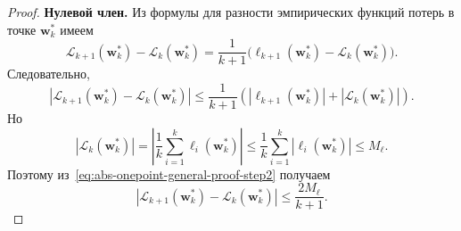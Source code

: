 \begin{proof}
    \textbf{Нулевой член.}
    Из формулы для разности эмпирических функций потерь в точке $\mathbf w_k^*$
    имеем
    \begin{equation}
        \label{eq:abs-onepoint-general-proof-step1}
        \mathcal L_{k+1}(\mathbf w_k^*)-\mathcal L_k(\mathbf w_k^*)
        =
        \frac{1}{k+1}
        \Big(
            \ell_{k+1}(\mathbf w_k^*)-\mathcal L_k(\mathbf w_k^*)
        \Big).
    \end{equation}
    Следовательно,
    \begin{equation}
        \label{eq:abs-onepoint-general-proof-step2}
        \left|
            \mathcal L_{k+1}(\mathbf w_k^*)-\mathcal L_k(\mathbf w_k^*)
        \right|
        \leqslant
        \frac{1}{k+1}
        \left(
            |\ell_{k+1}(\mathbf w_k^*)|
            +
            |\mathcal L_k(\mathbf w_k^*)|
        \right).
    \end{equation}
    Но
    \begin{equation}
        \label{eq:abs-onepoint-general-proof-step3}
        |\mathcal L_k(\mathbf w_k^*)|
        =
        \left|
            \frac{1}{k}\sum_{i=1}^k \ell_i(\mathbf w_k^*)
        \right|
        \leqslant
        \frac{1}{k}\sum_{i=1}^k |\ell_i(\mathbf w_k^*)|
        \leqslant
        M_\ell.
    \end{equation}
    Поэтому из~\eqref{eq:abs-onepoint-general-proof-step2} получаем
    \begin{equation}
        \label{eq:abs-onepoint-general-proof-step4}
        \left|
            \mathcal L_{k+1}(\mathbf w_k^*)-\mathcal L_k(\mathbf w_k^*)
        \right|
        \leqslant
        \frac{2M_\ell}{k+1}.
    \end{equation}


\end{proof}
